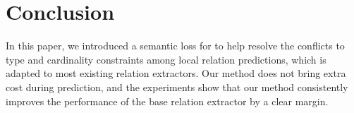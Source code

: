 \section{Conclusion}
In this paper, we introduced a semantic loss for \RE to help resolve the conflicts to type and cardinality constraints among local relation predictions,
which is adapted to most existing relation extractors.
Our method does not bring extra cost during prediction,
and the experiments show that our method consistently improves the performance of the base relation extractor by a clear margin. 
